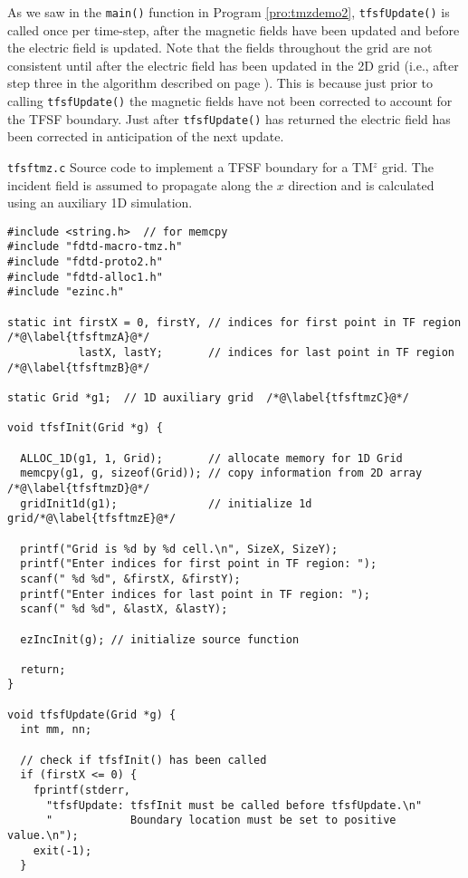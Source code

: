 As we saw in the {\tt main()} function in Program \ref{pro:tmzdemo2},
{\tt tfsfUpdate()} is called once per time-step, after the magnetic
fields have been updated and before the electric field is updated.
Note that the fields throughout the grid are not consistent until
after the electric field has been updated in the 2D grid (i.e., after
step three in the algorithm described on page
\pageref{page:tfsfUpdateAlgorithm}).  This is because just prior to
calling {\tt tfsfUpdate()} the magnetic fields have not been corrected
to account for the TFSF boundary.  Just after {\tt tfsfUpdate()} has
returned the electric field has been corrected in anticipation of the
next update.

\begin{program}
{\tt tfsftmz.c}
Source code to implement a TFSF boundary for a TM$^z$ grid.  The
incident field is assumed to propagate along the $x$ direction and is
calculated using an auxiliary 1D simulation.
\label{pro:tfsftmz}
\codemiddle
\begin{lstlisting}
#include <string.h>  // for memcpy
#include "fdtd-macro-tmz.h"
#include "fdtd-proto2.h"
#include "fdtd-alloc1.h"
#include "ezinc.h"

static int firstX = 0, firstY, // indices for first point in TF region /*@\label{tfsftmzA}@*/
           lastX, lastY;       // indices for last point in TF region  /*@\label{tfsftmzB}@*/

static Grid *g1;  // 1D auxiliary grid  /*@\label{tfsftmzC}@*/

void tfsfInit(Grid *g) {

  ALLOC_1D(g1, 1, Grid);       // allocate memory for 1D Grid
  memcpy(g1, g, sizeof(Grid)); // copy information from 2D array /*@\label{tfsftmzD}@*/
  gridInit1d(g1);              // initialize 1d grid/*@\label{tfsftmzE}@*/

  printf("Grid is %d by %d cell.\n", SizeX, SizeY);
  printf("Enter indices for first point in TF region: ");
  scanf(" %d %d", &firstX, &firstY);
  printf("Enter indices for last point in TF region: ");
  scanf(" %d %d", &lastX, &lastY);

  ezIncInit(g); // initialize source function

  return;
}

void tfsfUpdate(Grid *g) {
  int mm, nn;

  // check if tfsfInit() has been called
  if (firstX <= 0) {
    fprintf(stderr,
      "tfsfUpdate: tfsfInit must be called before tfsfUpdate.\n"
      "            Boundary location must be set to positive value.\n");
    exit(-1);
  }


\end{lstlisting}
\end{program}
